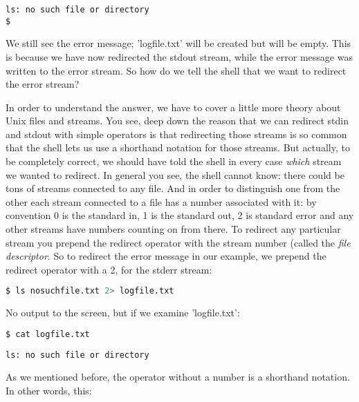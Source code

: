 \scriptsize
\begin{verbatim}
ls: no such file or directory
$
\end{verbatim}
\normalsize

We still see the error message; 'logfile.txt' will be created but will be
empty. This is because we have now redirected the stdout stream, while the
error message was written to the error stream. So how do we tell the shell that
we want to redirect the error stream?

In order to understand the answer, we have to cover a little more theory about
Unix files and streams. You see, deep down the reason that we can redirect
stdin and stdout with simple operators is that redirecting those streams is so
common that the shell lets us use a shorthand notation for those streams. But
actually, to be completely correct, we should have told the shell in every case
\emph{which} stream we wanted to redirect. In general you see, the shell cannot
know: there could be tons of streams connected to any file. And in order to
distinguish one from the other each stream connected to a file has a number
associated with it: by convention 0 is the standard in, 1 is the standard out,
2 is standard error and any other streams have numbers counting on from there.
To redirect any particular stream you prepend the redirect operator with the
stream number (called the \emph{file descriptor}. So to redirect the error
message in our example, we prepend the redirect operator with a 2, for the
stderr stream:
\lstset{basicstyle=\scriptsize, numbers=left, captionpos=b, tabsize=4}
\begin{lstlisting}[caption=Redirecting the stderr stream,language={bash},
breaklines=true,xleftmargin=15pt,label=lst:Redirecting the stderr stream]
$ ls nosuchfile.txt 2> logfile.txt
\end{lstlisting}

No output to the screen, but if we examine 'logfile.txt':
\lstset{basicstyle=\scriptsize, numbers=left, captionpos=b, tabsize=4}
\begin{lstlisting}[caption=Checking the logfile,language={bash},
breaklines=true,xleftmargin=15pt,label=lst:Checking the logfile]
$ cat logfile.txt
\end{lstlisting}

\scriptsize
\begin{verbatim}
ls: no such file or directory 
\end{verbatim}
\normalsize

As we mentioned before, the operator without a number is a shorthand notation.
In other words, this:

